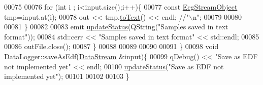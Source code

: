 \begin{DoxyCode}
00075 
00076                     \textcolor{keywordflow}{for} (\textcolor{keywordtype}{int} i ; i<input.size();i++)\{
00077                            \textcolor{keyword}{const} \hyperlink{structEcgStreamObject}{EcgStreamObject} tmp=input.at(i);
00078                                             out << tmp.\hyperlink{structEcgStreamObject_ae988014880bd678ae693545b6b1f0175}{toText}() << endl; \textcolor{comment}{//"\(\backslash\)n";}
00079 
00080 
00081                     \}
00082 
00083                 emit \hyperlink{classDataLogger_a59e42d6e77f7fd97ea23529abb6c275c}{updateStatus}(QString(\textcolor{stringliteral}{"Samples saved in text format"}));
00084                     std::cerr << \textcolor{stringliteral}{"Samples saved in text format"} << std::endl;
00085 
00086                     outFile.close();
00087                 \}
00088 
00089 
00090 
00091 \}
00098 \textcolor{keywordtype}{void} DataLogger::saveAsEdf(\hyperlink{classDataStream}{DataStream} &input)\{
00099     qDebug() << \textcolor{stringliteral}{"Save as EDF not implemented yet"} << endl;
00100     \hyperlink{classDataLogger_a59e42d6e77f7fd97ea23529abb6c275c}{updateStatus}(\textcolor{stringliteral}{"Save as EDF not implemented yet"});
00101 
00102 
00103 \}
\end{DoxyCode}
